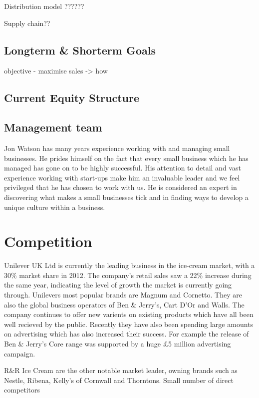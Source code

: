 \documentclass{article}
\begin{document}
Distribution model ??????

Supply chain??

  \subsection{Longterm \& Shorterm Goals}

    objective - maximise sales -> how


  \subsection{Current Equity Structure}

  \subsection{Management team}

Jon Watson has many years experience working with and managing small
businesses. He prides himself on the fact that every small business which he has managed has gone on to be highly successful. His attention to detail and vast experience working with start-ups make him an invaluable leader and we feel privileged that he has chosen to work with us. He is considered an expert in discovering what makes a small businesses tick and in finding ways to develop a unique culture within a business.


\section{Competition}

  Unilever UK Ltd is currently the leading business in the ice-cream market, with a 30\% market share in 2012. The company's retail sales saw a 22\% increase during the same year, indicating the level of growth the market is currently going through. Unilevers most popular brands are Magnum and Cornetto. They are also the global business operators of Ben & Jerry's, Cart D'Or and Walls. The company continues to offer new varients on existing products which have all been well recieved by the public. Recently they have also been spending large amounts on advertising which has also increased their success. For example the release of Ben & Jerry's Core range was supported by a huge £5 million advertising campaign.

  R&R Ice Cream are the other notable market leader, owning brands such as Nestle, Ribena, Kelly's of Cornwall and Thorntons.  
  Small number of direct competitors
\end{document}
